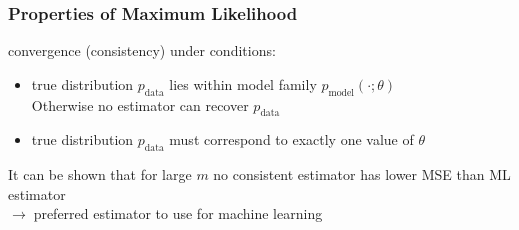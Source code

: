 \documentclass{article}
\newcommand{\arrow}{$\rightarrow\;$}
\newcommand{\p}[1]{p_\text{#1}}
\begin{document}
\subsubsection*{Properties of Maximum Likelihood}
convergence (consistency) under conditions:
\begin{itemize}
    \item true distribution $\p{data}$ lies within model family $\p{model}(\cdot;\theta)$ \\
    Otherwise no estimator can recover $\p{data}$
    \item true distribution $\p{data}$ must correspond to exactly one value of $\theta$
\end{itemize}
It can be shown that for large $m$ no consistent estimator has lower MSE than ML estimator \\
\arrow preferred estimator to use for machine learning
\end{document}
